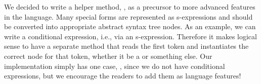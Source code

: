 We decided to write a helper method, , as a precursor to more advanced features in the language. Many special forms are represented as s-expressions and should be converted into appropriate abstract syntax tree nodes. As an example, we can write a conditional expression, i.e.,  via an s-expression. Therefore it makes logical sense to have a separate method that reads the first token and instantiates the correct node for that token, whether it be a  or something else. Our implementation simply has one case, , since we do not have conditional expressions, but we encourage the readers to add them as language features!
